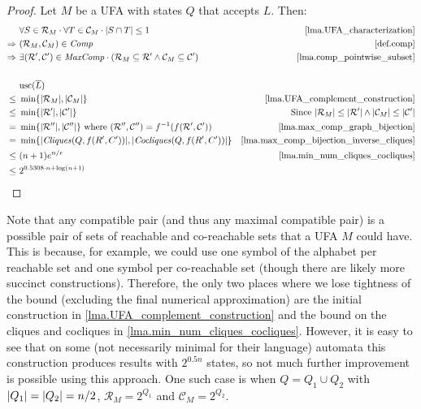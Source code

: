 \documentclass{report}
\DeclarePairedDelimiter{\set}{\{}{\}}
\DeclarePairedDelimiter{\abs}{\lvert}{\rvert}
\theoremstyle{definition}
\begin{document}
\begin{proof}
Let $M$ be a UFA with states $Q$ that accepts $L$. Then:
\begin{align*}
& \forall S \in \mathcal{R}_M \cdot \forall T \in \mathcal{C}_M \cdot
\abs{S \cap T} \leq 1
& \text{\cref{lma.UFA_characterization}} \\
\Rightarrow \ & (\mathcal{R}_M, \mathcal{C}_M) \in \mathit{Comp}
& \text{\cref{def.comp}} \\
\Rightarrow \ & \exists (\mathcal{R}', \mathcal{C}') \in \mathit{MaxComp} \cdot
(\mathcal{R}_M \subseteq \mathcal{R}' \wedge \mathcal{C}_M \subseteq \mathcal{C}')
& \text{\cref{lma.comp_pointwise_subset}} \\
\\
& \mathrm{usc}(\overline{L}) \\
\leq \ & \min\set{\abs{\mathcal{R}_M}, \abs{\mathcal{C}_M}}
& \text{\cref{lma.UFA_complement_construction}} \\
\leq \ & \min\set{\abs{\mathcal{R}'}, \abs{\mathcal{C}'}}
& \text{Since } \abs{\mathcal{R}_M} \leq \abs{\mathcal{R}'} \wedge
\abs{\mathcal{C}_M} \leq \abs{\mathcal{C}'} \\
= \ & \min\set{\abs{\mathcal{R}''}, \abs{\mathcal{C}''}}
\text{ where } (\mathcal{R}'', \mathcal{C}'') =
f^{-1} (f(\mathcal{R}', \mathcal{C}'))
& \text{\cref{lma.max_comp_graph_bijection}} \\
= \ & \min\set{\abs{\mathit{Cliques}(Q, f(R', C'))}, \abs{\mathit{Cocliques}(Q, f(R', C'))}}
& \text{\cref{lma.max_comp_bijection_inverse_cliques}} \\
\leq \ & (n + 1) e^{n / e}
& \text{\cref{lma.min_num_cliques_cocliques}} \\
\leq \ & 2^{0.5308 \cdot n + \log (n + 1)}
\end{align*}
\end{proof}

Note that any compatible pair (and thus any maximal compatible pair) is a possible
pair of sets of reachable and co-reachable sets that a UFA $M$ could have. This is
because, for example, we could use one symbol of the alphabet per reachable set and
one symbol per co-reachable set (though there are likely more succinct
constructions). Therefore, the only two places where we lose tightness of the bound
(excluding the final numerical approximation) are
the initial construction in \cref{lma.UFA_complement_construction} and the bound
on the cliques and cocliques in \cref{lma.min_num_cliques_cocliques}. However,
it is easy to see that on some (not necessarily minimal for their language) automata
this construction produces results with
$2^{0.5 n}$ states, so not much further improvement is possible using this approach.
One such case is when $Q = Q_1 \cup Q_2$ with $\abs{Q_1} = \abs{Q_2} = n / 2$,
$\mathcal{R}_M = 2^{Q_1}$ and $\mathcal{C}_M = 2^{Q_2}$.
\end{document}
